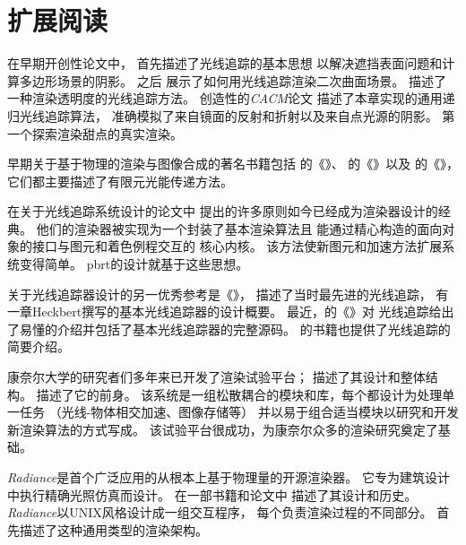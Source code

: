 \section{扩展阅读}\label{sec:扩展阅读1}

在早期开创性论文中，
\citet{10.1145/1468075.1468082}首先描述了光线追踪的基本思想
以解决遮挡表面问题和计算多边形场景的阴影。
\citet{doi:10.1177/003754977101600104}之后
展示了如何用光线追踪渲染二次曲面场景。
\citet{10.1145/800249.807438}描述了
一种渲染透明度的光线追踪方法。
\citet{10.1145/358876.358882}创造性的\emph{CACM}论文
描述了本章实现的通用递归光线追踪算法，
准确模拟了来自镜面的反射和折射以及来自点光源的阴影。
\citet{10.1145/37401.37411}第一个探索渲染甜点的真实渲染。

早期关于基于物理的渲染与图像合成的著名书籍包括
\citet{10.5555/154731}的《》、
\citet{10.5555/561383}的《》以及
\citet{10.5555/200607}的《》，
它们都主要描述了有限元光能传递方法。

\citet{Kirk88theray}在关于光线追踪系统设计的论文中
提出的许多原则如今已经成为渲染器设计的经典。
他们的渲染器被实现为一个封装了基本渲染算法且
能通过精心构造的面向对象的接口与图元和着色例程交互的
核心内核。
该方法使新图元和加速方法扩展系统变得简单。
pbrt的设计就基于这些思想。

关于光线追踪器设计的另一优秀参考是《》\citep{10.5555/94788}，
描述了当时最先进的光线追踪，
有一章Heckbert撰写的基本光线追踪器的设计概要。
最近，\citet{10.5555/940410}的《》对
光线追踪给出了易懂的介绍并包括了基本光线追踪器的完整源码。
\citet{10.5555/1324795}的书籍也提供了光线追踪的简要介绍。

康奈尔大学的研究者们多年来已开发了渲染试验平台；
\citet{egtp.19911035}
描述了其设计和整体结构。
\citet{4037684}描述了它的前身。
该系统是一组松散耦合的模块和库，每个都设计为处理单一任务
（光线-物体相交加速、图像存储等）
并以易于组合适当模块以研究和开发新渲染算法的方式写成。
该试验平台很成功，为康奈尔众多的渲染研究奠定了基础。

\emph{Radiance}是首个广泛应用的从根本上基于物理量的开源渲染器。
它专为建筑设计中执行精确光照仿真而设计。
\citeauthor{10.1145/192161.192286}在一部书籍和论文中
\citep{10.1145/192161.192286,10.5555/286090}描述了其设计和历史。
\emph{Radiance}以UNIX风格设计成一组交互程序，
每个负责渲染过程的不同部分。
\citet{10.1145/325334.325174}首先描述了这种通用类型的渲染架构。

